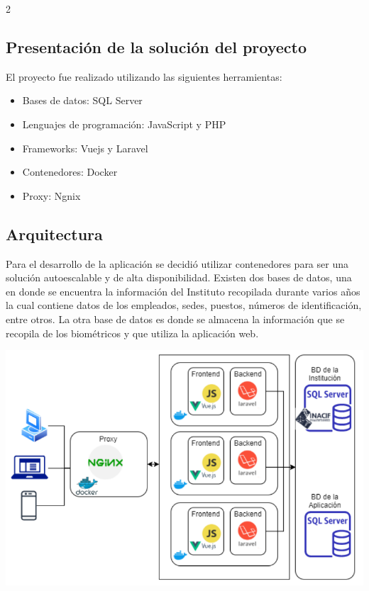 \documentclass[12pt,spanish,Letterpaper,openany]{book}
\providecommand{\tightlist}{%
  \setlength{\itemsep}{0pt}\setlength{\parskip}{0pt}}
\begin{document}
\begin {multicols}{2}
\hypertarget{presentaciuxf3n-de-la-soluciuxf3n-del-proyecto}{%
\subsection{Presentación de la solución del proyecto}\label{presentaciuxf3n-de-la-soluciuxf3n-del-proyecto}}

El proyecto fue realizado utilizando las siguientes herramientas:

\begin{itemize}
\tightlist
\item
  Bases de datos: SQL Server
\item
  Lenguajes de programación: JavaScript y PHP
\item
  Frameworks: Vuejs y Laravel
\item
  Contenedores: Docker
\item
  Proxy: Ngnix
\end{itemize}

\hypertarget{arquitectura}{%
\subsection{Arquitectura}\label{arquitectura}}

Para el desarrollo de la aplicación se decidió utilizar contenedores para ser una solución autoescalable y de alta disponibilidad. Existen dos bases de datos, una en donde se encuentra la información del Instituto recopilada durante varios años la cual contiene datos de los empleados, sedes, puestos, números de identificación, entre otros. La otra base de datos es donde se almacena la información que se recopila de los biométricos y que utiliza la aplicación web.

\begin {flushleft}
\noindent\begin{minipage}[c]{\columnwidth}

\centering

\includegraphics[width=0.8\linewidth]{images/06_05}

\end{minipage}

\end {flushleft}

\end {multicols}
\end{document}
